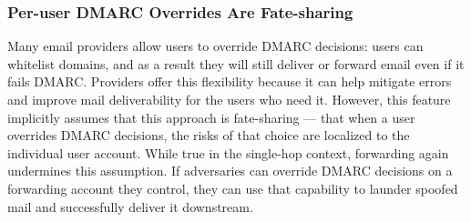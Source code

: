 
%

\subsubsection{Per-user DMARC Overrides Are Fate-sharing}
\label{subsubsec:whitelist}
Many email providers allow users to override DMARC decisions: users can whitelist domains, and as a result they will still deliver or forward email even if it fails DMARC.
Providers offer this flexibility because it can help mitigate
errors and improve mail deliverability for the users who need it.
However, this feature implicitly assumes that this approach is
fate-sharing --- that when a user overrides DMARC decisions, the risks
of that choice are localized to the individual user account.  While
true in the single-hop context, forwarding again undermines this
assumption.  If adversaries can override DMARC decisions on a
forwarding account they control, they can use that capability to
launder spoofed mail and successfully deliver it downstream.


